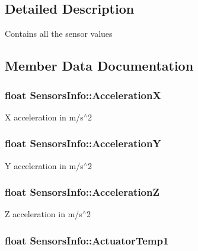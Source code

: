 \subsection{Detailed Description}
\par
Contains all the sensor values 



\subsection{Member Data Documentation}
\hypertarget{struct_sensors_info_a3d4a04448cbb350ce537758ec9c38e51}{
\subsubsection[{Acceleration\-X}]{\setlength{\rightskip}{0pt plus 5cm}float Sensors\-Info\-::\-Acceleration\-X}}\label{struct_sensors_info_a3d4a04448cbb350ce537758ec9c38e51}
X acceleration in m/s$^\wedge$2 \hypertarget{struct_sensors_info_af8316a86022a11ef16181d5cbc6e266e}{
\subsubsection[{Acceleration\-Y}]{\setlength{\rightskip}{0pt plus 5cm}float Sensors\-Info\-::\-Acceleration\-Y}}\label{struct_sensors_info_af8316a86022a11ef16181d5cbc6e266e}
Y acceleration in m/s$^\wedge$2 \hypertarget{struct_sensors_info_a98074de49d42dbb1b303e5e68e03cc90}{
\subsubsection[{Acceleration\-Z}]{\setlength{\rightskip}{0pt plus 5cm}float Sensors\-Info\-::\-Acceleration\-Z}}\label{struct_sensors_info_a98074de49d42dbb1b303e5e68e03cc90}
Z acceleration in m/s$^\wedge$2 \hypertarget{struct_sensors_info_a9aa0da9e61455fd8b3faa91ad5970985}{
\subsubsection[{Actuator\-Temp1}]{\setlength{\rightskip}{0pt plus 5cm}float Sensors\-Info\-::\-Actuator\-Temp1}}\label{struct_sensors_info_a9aa0da9e61455fd8b3faa91ad5970985}
